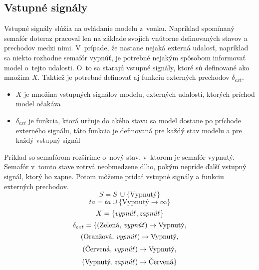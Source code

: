 \subsection*{Vstupné signály}
Vstupné signály slúžia na ovládanie modelu z~vonku.
Napríklad spomínaný semafór doteraz pracoval len na základe svojich vnútorne definovaných stavov a prechodov medzi nimi.
V~prípade, že nastane nejaká externá udalosť, napríklad sa niekto rozhodne semafór vypnúť, je potrebné nejakým spôsobom informovať model o~tejto udalosti.
O~to sa starajú vstupné signály, ktoré sú definované ako množina $X$.
Taktiež je potrebné definovať aj funkciu externých prechodov ${\delta}_{ext}$.
\begin{itemize}
  \item $X$ je množina vstupných signálov modelu, externých udalostí, ktorých príchod model očakáva
  \item ${\delta}_{ext}$ je funkcia, ktorá určuje do akého stavu sa model dostane po príchode externého signálu, táto funkcia je definovaná pre každý stav modelu a pre každý vstupný signál
\end{itemize}
Príklad so semafórom rozšírime o~nový stav, v~ktorom je semafór vypnutý.
Semafór v~tomto stave zotrvá neobmedzene dlho, pokým nepríde ďalší vstupný signál, ktorý ho zapne.
Potom môžeme pridať vstupné signály a funkciu externých prechodov.
\[S = S~\cup \{ \text{Vypnutý} \}\]
\[ta = ta \cup \{ \text{Vypnutý} \rightarrow \infty \}\]
\[X = \{\text{\textit{vypnúť}}, \text{\textit{zapnúť}} \}\]
\[\delta_{ext} = \{ (\text{Zelená, \textit{vypnúť}}) \rightarrow \text{Vypnutý},\]
\[(\text{Oranžová, \textit{vypnúť}}) \rightarrow \text{Vypnutý},\]
\[(\text{Červená, \textit{vypnúť}}) \rightarrow \text{Vypnutý},\]
\[(\text{Vypnutý, \textit{zapnúť}}) \rightarrow \text{Červená} \}\]  

